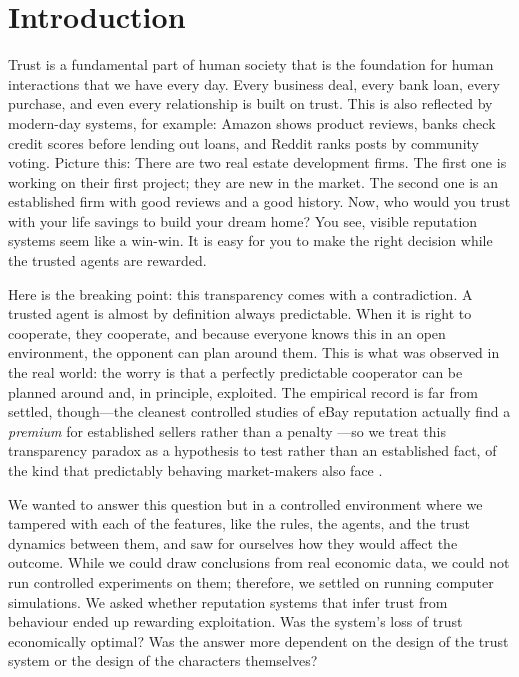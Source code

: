 \documentclass[10pt]{article} %
\begin{document}
\section{Introduction}

Trust is a fundamental part of human society that is the
foundation for human interactions that we have every day. Every
business deal, every bank loan, every purchase, and even every
relationship is built on trust. This is also reflected by
modern-day systems, for example: Amazon shows product reviews,
banks check credit scores before lending out loans, and Reddit
ranks posts by community voting. Picture this: There are two real
estate development firms. The first one is working on their first
project; they are new in the market. The second one is an
established firm with good reviews and a good history. Now, who
would you trust with your life savings to build your dream home?
You see, visible reputation systems seem like a win-win. It is
easy for you to make the right decision while the trusted agents
are rewarded.

Here is the breaking point: this transparency comes with a
contradiction. A trusted agent is almost by definition always
predictable. When it is right to cooperate, they cooperate, and
because everyone knows this in an open environment, the opponent
can plan around them. This is what was observed in the real
world: the worry is that a perfectly predictable cooperator can be
planned around and, in principle, exploited. The empirical record is
far from settled, though---the cleanest controlled studies of eBay
reputation actually find a \emph{premium} for established sellers
rather than a penalty \citep{resnick2002trust,bolton2004effective}---so
we treat this transparency paradox as a hypothesis to test rather
than an established fact, of the kind that predictably behaving
market-makers also face \citep{glosten1985bid}.

We wanted to answer this question but in a controlled environment
where we tampered with each of the features, like the rules, the
agents, and the trust dynamics between them, and saw for ourselves
how they would affect the outcome. While we could draw conclusions
from real economic data, we could not run controlled experiments
on them; therefore, we settled on running computer simulations. We
asked whether reputation systems that infer trust from behaviour
ended up rewarding exploitation. Was the system's loss of trust
economically optimal? Was the answer more dependent on the design
of the trust system or the design of the characters themselves?
\end{document}
